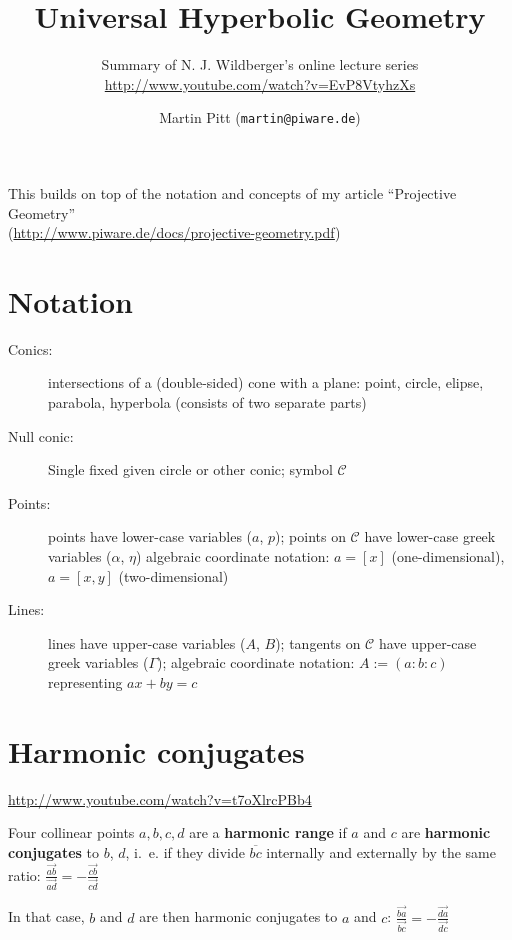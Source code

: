 \documentclass[DIV16,halfparskip]{scrartcl}
\newcommand{\nullcm}{\mathcal C}
\newcommand{\nullconic}{$\nullcm$ }
\newcommand{\C}{\!\!:\!\!}
\begin{document}
\title{Universal Hyperbolic Geometry}
\subtitle{Summary of N. J. Wildberger's online lecture series\\
          \url{http://www.youtube.com/watch?v=EvP8VtyhzXs}}
      \author{Martin Pitt (\texttt{martin@piware.de})}
      \date{}
\maketitle

This builds on top of the notation and concepts of my article ``Projective
Geometry''\\ (\url{http://www.piware.de/docs/projective-geometry.pdf})

\section{Notation}
\begin{description}
    \item [Conics:] intersections of a (double-sided) cone with a plane: point,
        circle, elipse, parabola, hyperbola (consists of two separate parts)
    \item [Null conic:] Single fixed given circle or other conic; symbol \nullconic
    \item [Points:] points have lower-case variables ($a$, $p$); points
        on \nullconic have lower-case greek variables ($\alpha$,
        $\eta$)
        algebraic coordinate notation: $a = [x]$ (one-dimensional), $a = [x,y]$
        (two-dimensional)
    \item [Lines:] lines have upper-case variables ($A$, $B$); tangents on
        \nullconic have upper-case greek variables ($\Gamma$);
        algebraic coordinate notation: $A := (a\C b\C c)$ representing $ax+by=c$
\end{description}

\section{Harmonic conjugates}
\url{http://www.youtube.com/watch?v=t7oXlrcPBb4}

Four collinear points $a, b, c, d$ are a \textbf{harmonic range} if $a$ and $c$
are \textbf{harmonic conjugates} to $b$, $d$, i.~e. if they divide $\overline{bc}$
internally and externally by the same ratio:
    $ \frac{\vec{ab}}{\vec{ad}} = -\frac{\vec{cb}}{\vec{cd}}$

In that case, $b$ and $d$ are then harmonic conjugates to $a$ and $c$:
    $ \frac{\vec{ba}}{\vec{bc}} = -\frac{\vec{da}}{\vec{dc}}$ 
\end{document}
